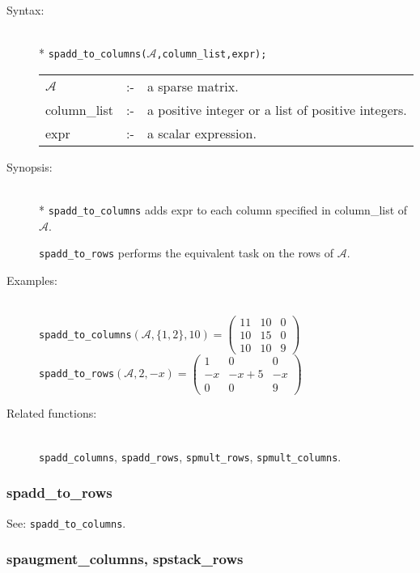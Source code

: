 \begin{description}
  \item[Syntax:]\mbox{}\\*
\texttt{spadd\_to\_columns($\mathcal{A}$,column\_list,expr);}\\[2mm]
\begin{tabular}{l l l}
$\mathcal{A}$   &:-& a sparse matrix. \\
column\_list &:-& a positive integer or a list of positive integers. \\
expr        &:-& a scalar expression.
\end{tabular}

\item[Synopsis:]\mbox{}\\*
\texttt{spadd\_to\_columns} adds expr to each column specified in
column\_list of $\mathcal{A}$.

\texttt{spadd\_to\_rows} performs the equivalent task on the rows of
$\mathcal{A}$.

\item[Examples:]\mbox{}\\
\texttt{spadd\_to\_columns}\((\mathcal{A},\{1,2\},10)  =
\begin{pmatrix} 11 & 10 & 0 \\ 10 & 15 & 0 \\ 10 & 10 & 9 \end{pmatrix}\) \\[2mm]
\texttt{spadd\_to\_rows}\((\mathcal{A},2,-x)  =
\begin{pmatrix} 1 & 0 & 0 \\ -x & -x+5 & -x \\ 0 & 0 & 9 \end{pmatrix}\)

\item[Related functions:]\mbox{}\\
\texttt{spadd\_columns}, \texttt{spadd\_rows}, \texttt{spmult\_rows},
\texttt{spmult\_columns}.
\end{description}

\subsubsection{spadd\_to\_rows}
\label{sparse:spadd_to_rows}

See: \texttt{spadd\_to\_columns}.


\subsubsection{spaugment\_columns, spstack\_rows}
\label{sparse:spaugment_columns}

